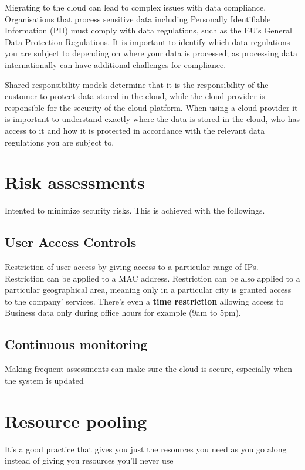 \documentclass[a4paper,12pt]{book}
\begin{document}
Migrating to the cloud can lead to complex issues with data compliance. Organisations that process sensitive data including Personally Identifiable Information (PII) must comply with data regulations, such as the EU’s General Data Protection Regulations. It is important to identify which data regulations you are subject to depending on where your data is processed; as processing data internationally can have additional challenges for compliance.

Shared responsibility models determine that it is the responsibility of the customer to protect data stored in the cloud, while the cloud provider is responsible for the security of the cloud platform. When using a cloud provider it is important to understand exactly where the data is stored in the cloud, who has access to it and how it is protected in accordance with the relevant data regulations you are subject to.

\section{Risk assessments}
Intented to minimize security risks. This is achieved with the followings.
\subsection{User Access Controls}
Restriction of user access by giving access to a particular range of IPs. Restriction can be applied to a MAC address. Restriction can be also applied to a particular geographical area, meaning only in a particular city is granted access to the company' services. There's even a \textbf{time restriction} allowing access to Business data only during office hours for example (9am to 5pm).
\subsection{Continuous monitoring}
Making frequent assessments can make sure the cloud is secure, especially when the system is updated 
\section{Resource pooling}
It's a good practice that gives you just the resources you need as you go along instead of giving you resources you'll never use
\clearpage
\printindex
\end{document}
